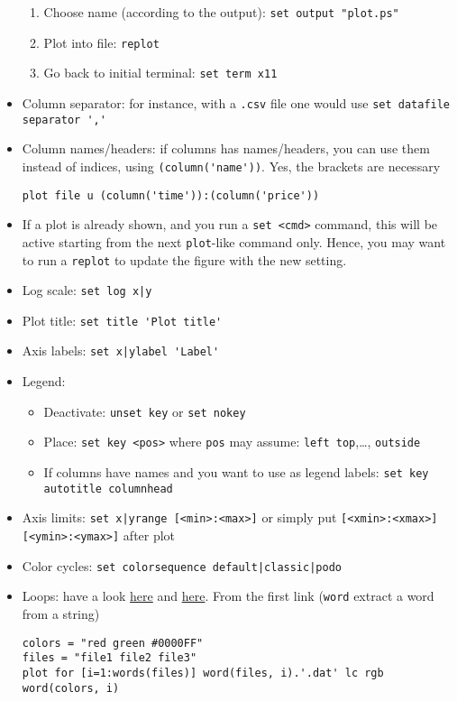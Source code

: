 \documentclass[a4paper,12pt,%
              final%
              ]{article}
\begin{document}
\begin{itemize}
\begin{enumerate}
      \item Choose name (according to the output): \verb|set output "plot.ps"|
      \item Plot into file: \verb|replot|
      \item Go back to initial terminal: \verb|set term x11|
    \end{enumerate}
  \item Column separator: for instance, with a \texttt{.csv} file one would use \verb|set datafile separator ','|
  \item Column names/headers: if columns has names/headers, you can use them instead of indices, using \verb|(column('name'))|. Yes, the brackets are necessary
\begin{verbatim}
plot file u (column('time')):(column('price'))
\end{verbatim}
  \item If a plot is already shown, and you run a \verb|set <cmd>| command, this will be active starting from the next \verb|plot|-like command only. Hence, you may want to run a \verb|replot| to update the figure with the new setting.
  \item Log scale: \verb!set log x|y!
  \item Plot title: \verb|set title 'Plot title'|
  \item Axis labels: \verb!set x|ylabel 'Label'!
  \item Legend:
    \begin{itemize}
      \item Deactivate: \verb|unset key| or \verb|set nokey|
      \item Place: \verb|set key <pos>| where \verb|pos| may assume: \verb|left top|,\ldots, \verb|outside|
      \item If columns have names and you want to use as legend labels: \texttt{set key autotitle columnhead}
    \end{itemize}
  \item Axis limits: \verb!set x|yrange [<min>:<max>]! or simply put \verb![<xmin>:<xmax>] [<ymin>:<ymax>]! after plot
  \item Color cycles: \verb!set colorsequence default|classic|podo!
  \item Loops: have a look \href{https://stackoverflow.com/a/18592561}{here} and \href{https://stackoverflow.com/a/14947085}{here}. From the first link (\verb|word| extract a word from a string)
\begin{verbatim}
colors = "red green #0000FF"
files = "file1 file2 file3"
plot for [i=1:words(files)] word(files, i).'.dat' lc rgb word(colors, i)
\end{verbatim}
\end{itemize}
\end{document}
